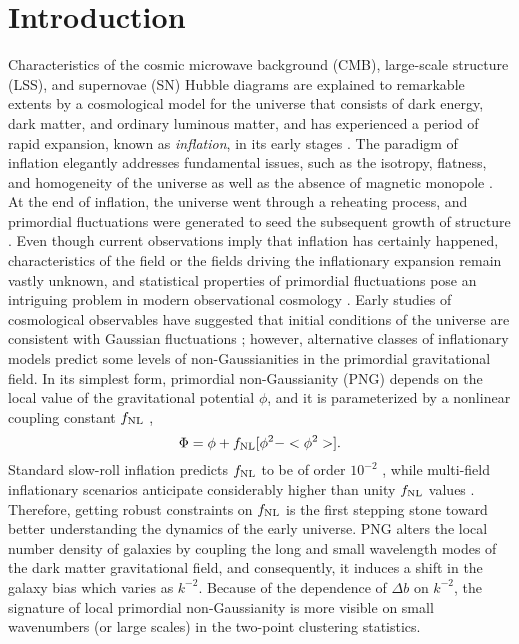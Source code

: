 \section{Introduction}
\label{sec:introduction}
Characteristics of the cosmic microwave background (CMB), large-scale structure (LSS), and supernovae (SN) Hubble diagrams are explained to remarkable extents by a cosmological model for the universe that consists of dark energy, dark matter, and ordinary luminous matter, and has experienced a period of rapid expansion, known as \textit{inflation}, in its early stages \citep[see, e.g.,][]{weinberg2013observational}. The paradigm of inflation elegantly addresses fundamental issues, such as the isotropy, flatness, and homogeneity of the universe as well as the absence of magnetic monopole \citep[see, e.g.,][]{weinberg2008cosmology}. At the end of inflation, the universe went through a reheating process, and primordial fluctuations were generated to seed the subsequent growth of structure \citep{kofman1994reheating, bassett2006inflation, lyth2009primordial}. Even though current observations imply that inflation has certainly happened, characteristics of the field or the fields driving the inflationary expansion remain vastly unknown, and statistical properties of primordial fluctuations pose an intriguing problem in modern observational cosmology \citep[see, e.g.,][for a review]{Biagetti2019Galax...7...71B}. Early studies of cosmological observables have suggested that initial conditions of the universe are consistent with Gaussian fluctuations \citep{PhysRevD.69.103501, guth2005inflationary}; however, alternative classes of inflationary models predict some levels of non-Gaussianities in the primordial gravitational field. In its simplest form, primordial non-Gaussianity (PNG) depends on the local value of the gravitational potential $\phi$, and it is parameterized by a nonlinear coupling constant $f_{\rm NL}$ \citep{komatsu2001acoustic},
\begin{equation}
 \Phi = \phi + f_{\rm NL} [\phi^{2} - <\phi^{2}>].
\end{equation}
Standard slow-roll inflation predicts $f_{\rm NL}$ to be of order $10^{-2}$ \citep[see, e.g.,][for a review]{alvarez2014arXiv1412.4671A}, while multi-field inflationary scenarios anticipate considerably higher than unity $f_{\rm NL}$ values \citep[see, e.g.,][]{de2017next}. Therefore, getting robust constraints on $f_{\rm NL}$ is the first stepping stone toward better understanding the dynamics of the early universe. PNG alters the local number density of galaxies by coupling the long and small wavelength modes of the dark matter gravitational field, and consequently, it induces a shift in the galaxy bias which varies as $k^{-2} $\citep[see, e.g.,][]{dalal2008imprints, slosar2008constraints}. Because of the dependence of $\Delta b$ on $k^{-2}$, the signature of local primordial non-Gaussianity is more visible on small wavenumbers (or large scales) in the two-point clustering statistics. 

